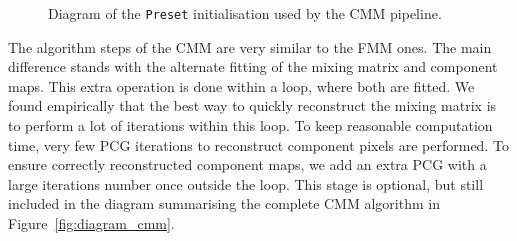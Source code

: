 \documentclass[../../thesis.tex]{subfiles}
\begin{document}
\begin{figure}[htbp]
{%
}
\caption{Diagram of the \texttt{Preset} initialisation used by the CMM pipeline.}
\label{fig:diagram_preset}
\end{figure}

The algorithm steps of the CMM are very similar to the FMM ones. The main difference stands with the alternate fitting of the mixing matrix and component maps. This extra operation is done within a loop, where both are fitted. 
We found empirically that the best way to quickly reconstruct the mixing matrix is to perform a lot of iterations within this loop. To keep reasonable computation time, very few PCG iterations to reconstruct component pixels are performed. To ensure  correctly reconstructed component maps, we add an extra PCG with a large iterations number once outside the loop. This stage is optional, but still included in the diagram summarising the complete CMM algorithm in Figure~\ref{fig:diagram_cmm}. 
\end{document}
